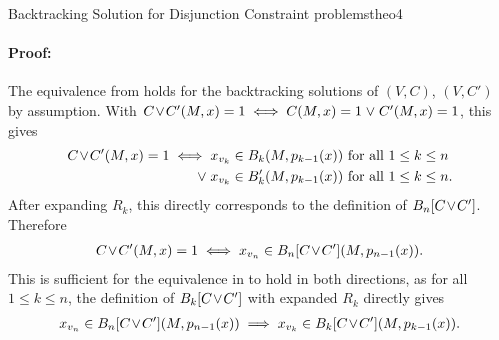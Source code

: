 \begin{theorem}{Backtracking Solution for Disjunction Constraint problems}{theo4}
    \paragraph*{Proof:}
    The equivalence from  holds for the backtracking
    solutions of $(V,C)$, $(V,C')$ by assumption.
    With $C\hspace{-0.5mm}\lor\hspace{-0.5mm}C'(M,x)=1\iff C(M,x)=1\mathrel\lor C'(M,x)=1$,
    this gives
    \begin{align*}
        C\hspace{-0.5mm}\lor\hspace{-0.5mm}C'(M,x)=1\iff{}&x_{v_k}\in B_k(M,p_{k-1}(x))\text{ for all }1\leq k\leq n\\
                                            \mathrel\lor{}&x_{v_k}\in B'_k(M,p_{k-1}(x))\text{ for all }1\leq k\leq n.
    \end{align*}
    After expanding $R_k$, this directly corresponds to the definition of
    $B_n[C\hspace{-0.5mm}\lor\hspace{-0.5mm}C']$.
    Therefore
    \begin{align*}
        C\hspace{-0.5mm}\lor\hspace{-0.5mm}C'(M,x)=1\iff{}x_{v_n}\in B_n[C\hspace{-0.5mm}\lor\hspace{-0.5mm}C'](M,p_{n-1}(x)).
    \end{align*}
    This is sufficient for the equivalence in  to hold
    in both directions, as for all $1\leq k\leq n$, the definition of
    $B_k[C\hspace{-0.5mm}\lor\hspace{-0.5mm}C']$ with expanded $R_k$ directly
    gives
    \begin{align*}
        x_{v_n}\in B_n[C\hspace{-0.5mm}\lor\hspace{-0.5mm}C'](M,p_{n-1}(x))\implies x_{v_k}\in B_k[C\hspace{-0.5mm}\lor\hspace{-0.5mm}C'](M,p_{k-1}(x)).
    \end{align*}
\end{theorem}
